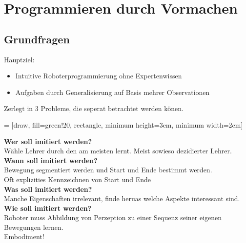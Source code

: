

\section{Programmieren durch Vormachen}

\subsection{Grundfragen}
Hauptziel:
\begin{itemize}
\item Intuitive Roboterprogrammierung ohne Expertenwissen
\item Aufgaben durch Generalisierung auf Basis mehrer Observationen
\end{itemize}

Zerlegt in 3 Probleme, die seperat betrachtet werden könen.


 = [draw, fill=green!20, rectangle, 
minimum height=3em, minimum width=2cm]
\begin{figure}[!h]
  \centering
\end{figure}

\textbf{Wer soll imitiert werden?}\\
Wähle Lehrer durch den am meisten lernt. Meist sowieso dezidierter Lehrer.\\

\textbf{Wann soll imitiert werden?}\\
Bewegung segmentiert werden und Start und Ende bestimmt werden.\\
Oft explizities Kennzeichnen von Start und Ende\\

\textbf{Was soll imitiert werden?}\\
Manche Eigenschaften irrelevant, finde heruas welche Aspekte interessant sind.\\

\textbf{Wie soll imitiert werden?}\\
Roboter muss Abbildung von Perzeption zu einer Sequenz seiner eigenen Bewegungen lernen.\\
Embodiment!

